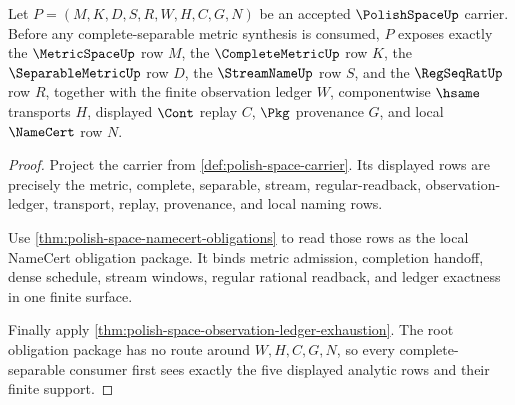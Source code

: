 \begin{theorem}
\label{thm:polish-space-root-obligation-package}
Let $P=(M,K,D,S,R,W,H,C,G,N)$ be an accepted $\PolishSpaceUp$ carrier. Before any complete-separable metric synthesis is consumed, $P$ exposes exactly the $\MetricSpaceUp$ row $M$, the $\CompleteMetricUp$ row $K$, the $\SeparableMetricUp$ row $D$, the $\StreamNameUp$ row $S$, and the $\RegSeqRatUp$ row $R$, together with the finite observation ledger $W$, componentwise $\hsame$ transports $H$, displayed $\Cont$ replay $C$, $\Pkg$ provenance $G$, and local $\NameCert$ row $N$.
\end{theorem}
\begin{proof}
Project the carrier from \autoref{def:polish-space-carrier}. Its displayed rows are precisely the metric, complete, separable, stream, regular-readback, observation-ledger, transport, replay, provenance, and local naming rows.

Use \autoref{thm:polish-space-namecert-obligations} to read those rows as the local NameCert obligation package. It binds metric admission, completion handoff, dense schedule, stream windows, regular rational readback, and ledger exactness in one finite surface.

Finally apply \autoref{thm:polish-space-observation-ledger-exhaustion}. The root obligation package has no route around $W,H,C,G,N$, so every complete-separable consumer first sees exactly the five displayed analytic rows and their finite support.
\end{proof}

